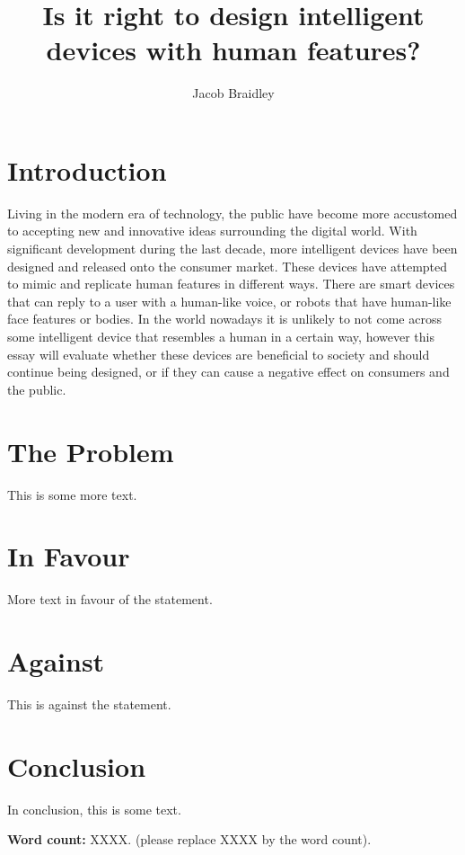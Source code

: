\documentclass{article}
\title{Is it right to design intelligent devices with human features?}
\author{Jacob Braidley}
\date{}
\begin{document}
\maketitle

\vspace{0.5cm}

\section{Introduction}
Living in the modern era of technology, the public have become more accustomed to accepting new and innovative ideas surrounding the digital world. With significant development during the last decade, more intelligent devices have been designed and released onto the consumer market. These devices have attempted to mimic and replicate human features in different ways. There are smart devices that can reply to a user with a human-like voice, or robots that have human-like face features or bodies. In the world nowadays it is unlikely to not come across some intelligent device that resembles a human in a certain way, however this essay will evaluate whether these devices are beneficial to society and should continue being designed, or if they can cause a negative effect on consumers and the public.

\section{The Problem}
This is some more text.

\section{In Favour}
More text in favour of the statement.

\section{Against}
This is against the statement.

\section{Conclusion}
In conclusion, this is some text.\cite{example2022example}

\vspace{.5cm}
\noindent \textbf{Word count:} XXXX. (please replace XXXX by the word count).



\end{document}
